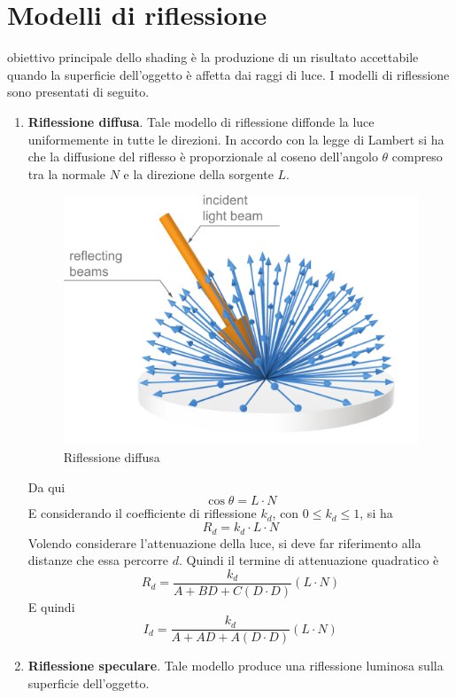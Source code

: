 \documentclass[9pt,a4paper,twoside]{tau}
\begin{document}
\section{Modelli di riflessione}
obiettivo principale dello shading è la produzione di un risultato accettabile quando la superficie dell'oggetto è affetta dai raggi di luce. I modelli di riflessione sono presentati di seguito.
\begin{enumerate}
	\item \textbf{Riflessione diffusa}. Tale modello di riflessione diffonde la luce uniformemente in tutte le direzioni. In accordo con la legge di Lambert si ha che la diffusione del riflesso è proporzionale al coseno dell'angolo $\theta$ compreso tra la normale $N$ e la direzione della sorgente $L$. 
		\begin{figure}[H]
	        \centering
	        \includegraphics[width=0.6\columnwidth]{Figures/05.png}
	        \caption{Riflessione diffusa}
	        \label{fig:figure}
		\end{figure}
		Da qui
		\begin{equation*}
			\cos{\theta} = L \cdot N
		\end{equation*}
		E considerando il coefficiente di riflessione $k_d$, con $0\leq k_d \leq 1$, si ha
		\begin{equation*}
			R_d = k_d \cdot L \cdot N
		\end{equation*}
		Volendo considerare l'attenuazione della luce, si deve far riferimento alla distanze che essa percorre $d$. Quindi il termine di attenuazione quadratico è
		\begin{equation*}
			R_d = \frac{k_d}{A + BD + C(D \cdot D)}(L \cdot N)
		\end{equation*}
		E quindi
		\begin{equation*}
			I_d = \frac{k_d}{A + AD + A(D\cdot D)}(L \cdot N)
		\end{equation*}
	\item \textbf{Riflessione speculare}. Tale modello produce una riflessione luminosa sulla superficie dell'oggetto.

\end{enumerate}
\end{document}
